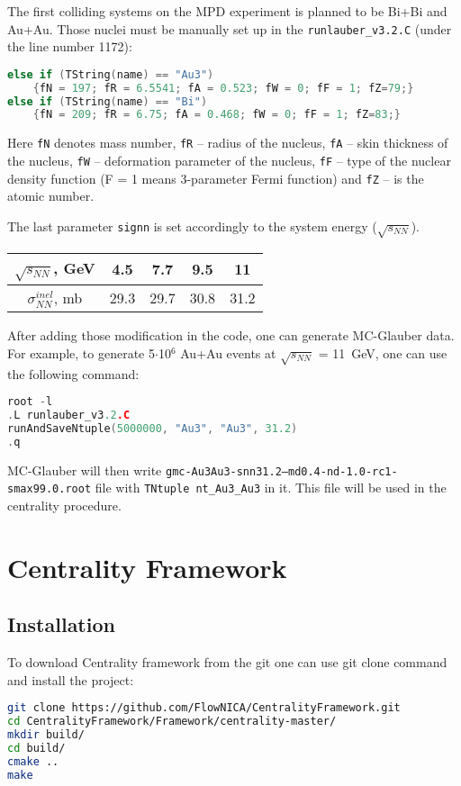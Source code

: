 \documentclass[11pt]{article}
\begin{document}
The first colliding systems on the MPD experiment is planned to be Bi+Bi and Au+Au.
Those nuclei must be manually set up in the \texttt{runlauber\_v3.2.C} (under the line number 1172):
\begin{lstlisting}[language=C++,caption={}]
else if (TString(name) == "Au3")
    {fN = 197; fR = 6.5541; fA = 0.523; fW = 0; fF = 1; fZ=79;}
else if (TString(name) == "Bi")
    {fN = 209; fR = 6.75; fA = 0.468; fW = 0; fF = 1; fZ=83;}
\end{lstlisting}
%
Here \texttt{fN} denotes mass number, \texttt{fR} -- radius of the nucleus, \texttt{fA} -- skin thickness of the nucleus, \texttt{fW} -- deformation parameter of the nucleus, \texttt{fF} -- type of the nuclear density function (F = 1 means 3-parameter Fermi function) and \texttt{fZ} -- is the atomic number.

The last parameter \texttt{signn} is set accordingly to the system energy ($\sqrt{s_{NN}}$).
\begin{center}
\begin{tabular}{ | c | c | c | c | c |}
\hline
 $\sqrt{s_{NN}}$, GeV & 4.5 & 7.7 & 9.5 & 11\\ 
 \hline
 $\sigma_{NN}^{inel}$, mb & 29.3 & 29.7 & 30.8 & 31.2  \\
 \hline
\end{tabular}
\end{center}

After adding those modification in the code, one can generate MC-Glauber data. For example, to generate 5$\cdot$10$^{6}$ Au+Au events at $\sqrt{s_{NN}}$ = 11~GeV, one can use the following command:
\begin{lstlisting}[language=C++,caption={}]
root -l
.L runlauber_v3.2.C
runAndSaveNtuple(5000000, "Au3", "Au3", 31.2)
.q
\end{lstlisting}
%

MC-Glauber will then write \texttt{gmc-Au3Au3-snn31.2--md0.4-nd-1.0-rc1-smax99.0.root} file with \texttt{TNtuple nt\_Au3\_Au3} in it. This file will be used in the centrality procedure.

\section{Centrality Framework}

\subsection{Installation}
To download Centrality framework from the git one can use git clone command and install the project:
\begin{lstlisting}[language=bash,caption={}]
git clone https://github.com/FlowNICA/CentralityFramework.git
cd CentralityFramework/Framework/centrality-master/
mkdir build/
cd build/
cmake ..
make
\end{lstlisting}
\end{document}
